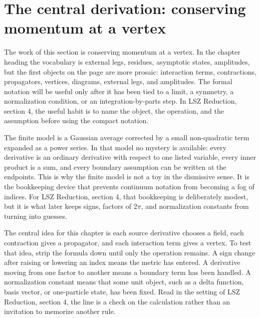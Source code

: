 \section{The central derivation: conserving momentum at a vertex}













The work of this section is conserving momentum at a vertex.  In the chapter heading the vocabulary is external legs, residues, asymptotic states, amplitudes, but the first objects on the page are more prosaic: interaction terms, contractions, propagators, vertices, diagrams, external legs, and amplitudes.  The formal notation will be useful only after it has been tied to a limit, a symmetry, a normalization condition, or an integration-by-parts step.  In LSZ Reduction, section 4, the useful habit is to name the object, the operation, and the assumption before using the compact notation.

The finite model is a Gaussian average corrected by a small non-quadratic term expanded as a power series.  In that model no mystery is available: every derivative is an ordinary derivative with respect to one listed variable, every inner product is a sum, and every boundary assumption can be written at the endpoints.  This is why the finite model is not a toy in the dismissive sense.  It is the bookkeeping device that prevents continuum notation from becoming a fog of indices.  For LSZ Reduction, section 4, that bookkeeping is deliberately modest, but it is what later keeps signs, factors of \(2\pi\), and normalization constants from turning into guesses.

The central idea for this chapter is each source derivative chooses a field, each contraction gives a propagator, and each interaction term gives a vertex.  To test that idea, strip the formula down until only the operation remains.  A sign change after raising or lowering an index means the metric has entered.  A derivative moving from one factor to another means a boundary term has been handled.  A normalization constant means that some unit object, such as a delta function, basis vector, or one-particle state, has been fixed.  Read in the setting of LSZ Reduction, section 4, the line is a check on the calculation rather than an invitation to memorize another rule.

